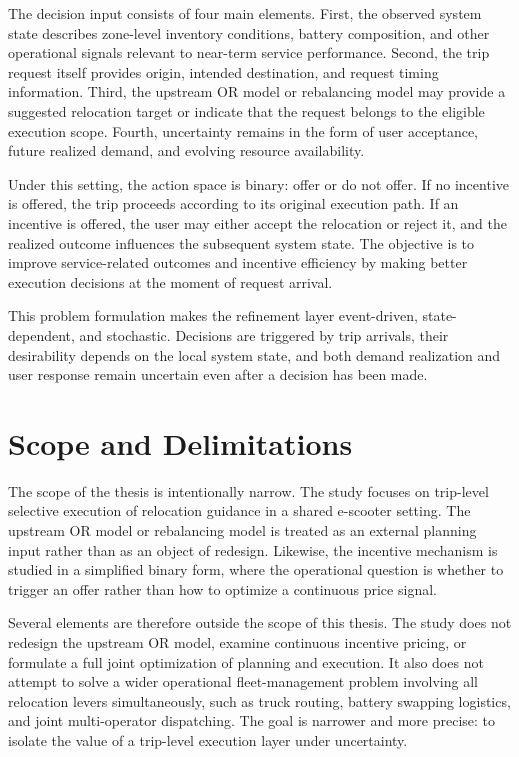 The decision input consists of four main elements. First, the observed system state describes zone-level inventory conditions, battery composition, and other operational signals relevant to near-term service performance. Second, the trip request itself provides origin, intended destination, and request timing information. Third, the upstream OR model or rebalancing model may provide a suggested relocation target or indicate that the request belongs to the eligible execution scope. Fourth, uncertainty remains in the form of user acceptance, future realized demand, and evolving resource availability.

Under this setting, the action space is binary: offer or do not offer. If no incentive is offered, the trip proceeds according to its original execution path. If an incentive is offered, the user may either accept the relocation or reject it, and the realized outcome influences the subsequent system state. The objective is to improve service-related outcomes and incentive efficiency by making better execution decisions at the moment of request arrival.

This problem formulation makes the refinement layer event-driven, state-dependent, and stochastic. Decisions are triggered by trip arrivals, their desirability depends on the local system state, and both demand realization and user response remain uncertain even after a decision has been made.

\section{Scope and Delimitations}

The scope of the thesis is intentionally narrow. The study focuses on trip-level selective execution of relocation guidance in a shared e-scooter setting. The upstream OR model or rebalancing model is treated as an external planning input rather than as an object of redesign. Likewise, the incentive mechanism is studied in a simplified binary form, where the operational question is whether to trigger an offer rather than how to optimize a continuous price signal.

Several elements are therefore outside the scope of this thesis. The study does not redesign the upstream OR model, examine continuous incentive pricing, or formulate a full joint optimization of planning and execution. It also does not attempt to solve a wider operational fleet-management problem involving all relocation levers simultaneously, such as truck routing, battery swapping logistics, and joint multi-operator dispatching. The goal is narrower and more precise: to isolate the value of a trip-level execution layer under uncertainty.

